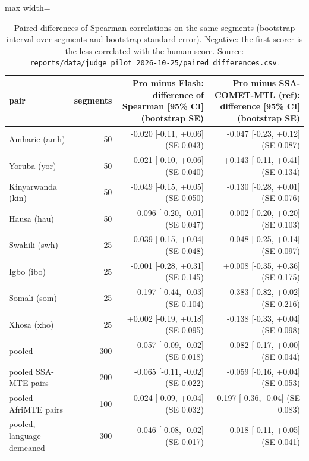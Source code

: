 \begin{table}[t]
\centering
\footnotesize
\setlength{\tabcolsep}{3pt}
\caption{Paired differences of Spearman correlations on the same segments (bootstrap interval over segments and bootstrap standard error). Negative: the first scorer is the less correlated with the human score. Source: \texttt{reports/data/judge\_pilot\_2026-10-25/paired\_differences.csv}.}
\label{tab:t_judge_pilot_pairs}
\begin{adjustbox}{max width=\linewidth}
{\def\LTcaptype{none} %
\begin{tabular}{@{}lrrr@{}}
\toprule
pair & segments & Pro minus Flash: difference of Spearman {[}95\% CI{]} (bootstrap SE) & Pro minus SSA-COMET-MTL (ref): difference {[}95\% CI{]} (bootstrap SE) \\
\midrule
Amharic (amh) & 50 & -0.020 {[}-0.11, +0.06{]} (SE 0.043) & -0.047 {[}-0.23, +0.12{]} (SE 0.087) \\
Yoruba (yor) & 50 & -0.021 {[}-0.10, +0.06{]} (SE 0.040) & +0.143 {[}-0.11, +0.41{]} (SE 0.134) \\
Kinyarwanda (kin) & 50 & -0.049 {[}-0.15, +0.05{]} (SE 0.050) & -0.130 {[}-0.28, +0.01{]} (SE 0.076) \\
Hausa (hau) & 50 & -0.096 {[}-0.20, -0.01{]} (SE 0.047) & -0.002 {[}-0.20, +0.20{]} (SE 0.103) \\
Swahili (swh) & 25 & -0.039 {[}-0.15, +0.04{]} (SE 0.048) & -0.048 {[}-0.25, +0.14{]} (SE 0.097) \\
Igbo (ibo) & 25 & -0.001 {[}-0.28, +0.31{]} (SE 0.145) & +0.008 {[}-0.35, +0.36{]} (SE 0.175) \\
Somali (som) & 25 & -0.197 {[}-0.44, -0.03{]} (SE 0.104) & -0.383 {[}-0.82, +0.02{]} (SE 0.216) \\
Xhosa (xho) & 25 & +0.002 {[}-0.19, +0.18{]} (SE 0.095) & -0.138 {[}-0.33, +0.04{]} (SE 0.098) \\
pooled & 300 & -0.057 {[}-0.09, -0.02{]} (SE 0.018) & -0.082 {[}-0.17, +0.00{]} (SE 0.044) \\
pooled SSA-MTE pairs & 200 & -0.065 {[}-0.11, -0.02{]} (SE 0.022) & -0.059 {[}-0.16, +0.04{]} (SE 0.053) \\
pooled AfriMTE pairs & 100 & -0.024 {[}-0.09, +0.04{]} (SE 0.032) & -0.197 {[}-0.36, -0.04{]} (SE 0.083) \\
pooled, language-demeaned & 300 & -0.046 {[}-0.08, -0.02{]} (SE 0.017) & -0.018 {[}-0.11, +0.05{]} (SE 0.041) \\
\bottomrule
\end{tabular}
}
\end{adjustbox}
\end{table}


